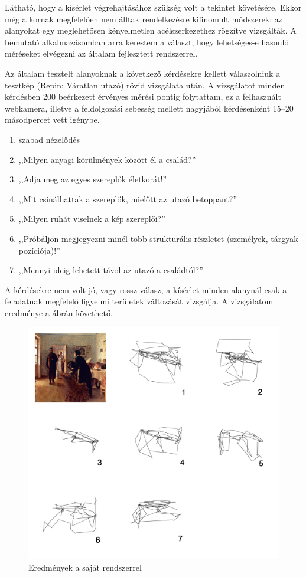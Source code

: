Látható, hogy a kísérlet végrehajtásához szükség volt a tekintet követésére. Ekkor még a kornak megfelelően nem álltak rendelkezésre kifinomult módszerek: az alanyokat egy meglehetősen kényelmetlen acélszerkezethez rögzítve vizsgálták. A bemutató alkalmazásomban arra kerestem a választ, hogy lehetséges-e hasonló méréseket elvégezni az általam fejlesztett rendszerrel.

\bigskip

Az általam tesztelt alanyoknak a következő kérdésekre kellett válaszolniuk a tesztkép (Repin: Váratlan utazó) rövid vizsgálata után. A vizsgálatot minden kérdésben 200 beérkezett érvényes mérési pontig folytattam, ez a felhasznált webkamera, illetve a feldolgozási sebesség mellett nagyjából kérdésenként 15--20 másodpercet vett igénybe.

\begin{enumerate}
 \item szabad nézelődés
 \item ,,Milyen anyagi körülmények között él a család?''
 \item ,,Adja meg az egyes szereplők életkorát!''
 \item ,,Mit csinálhattak a szereplők, mielőtt az utazó betoppant?''
 \item ,,Milyen ruhát viselnek a kép szereplői?''
 \item ,,Próbáljon megjegyezni minél több strukturális részletet (személyek, tárgyak pozíciója)!''
 \item ,,Mennyi ideig lehetett távol az utazó a családtól?''
\end{enumerate}

A kérdésekre nem volt jó, vagy rossz válasz, a kísérlet minden alanynál csak a feladatnak megfelelő figyelmi területek változását vizsgálja. A vizsgálatom eredménye a  ábrán követhető.

\begin{figure}[!ht]
\centering
\includegraphics[width=140mm, keepaspectratio]{figures/yarbus_eredmeny.png}
\caption{Eredmények a saját rendszerrel}
\label{fig:eredmeny}
\end{figure}

